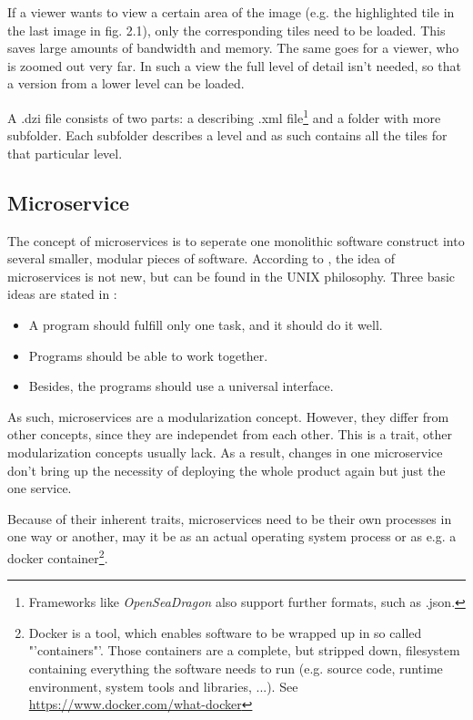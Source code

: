If a viewer wants to view a certain area of the image (e.g. the highlighted tile in the last image in fig. 2.1), only the corresponding tiles need to be loaded. This saves large amounts of bandwidth and memory. The same goes for a viewer, who is zoomed out very far. In such a view the full level of detail isn't needed, so that a version from a lower level can be loaded.

A .dzi file consists of two parts: a describing .xml file\footnote{Frameworks like \emph{OpenSeaDragon} also support further formats, such as .json.} and a folder with more subfolder. Each subfolder describes a level and as such contains all the tiles for that particular level.


\subsection{Microservice}

The concept of microservices is to seperate one monolithic software construct into several smaller, modular pieces of software. According to \cite{Wolff16}, the idea of microservices is not new, but can be found in the UNIX philosophy. Three basic ideas are stated in \cite{Wolff16}:

\begin{itemize}
	\item A program should fulfill only one task, and it should do it well.
	\item Programs should be able to work together.
	\item Besides, the programs should use a universal interface.
\end{itemize}

As such, microservices are a modularization concept. However, they differ from other concepts, since they are independet from each other. This is a trait, other modularization concepts usually lack. As a result, changes in one microservice don't bring up the necessity of deploying the whole product again but just the one service.

Because of their inherent traits, microservices need to be their own processes in one way or another, may it be as an actual operating system process or as e.g. a docker container\footnote{Docker is a tool, which enables software to be wrapped up in so called "'containers"'. Those containers are a complete, but stripped down, filesystem containing everything the software needs to run (e.g. source code, runtime environment, system tools and libraries, ...). See \url{https://www.docker.com/what-docker}}.

